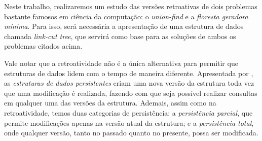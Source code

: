 Neste trabalho, realizaremos um estudo das versões retroativas de dois problemas bastante famosos em ciência da computação: o \emph{union-find} e a \emph{floresta geradora mínima}. Para isso, será necessária a apresentação de uma estrutura de dados chamada \emph{link-cut tree}, que servirá como base para as soluções de ambos os problemas citados acima.



Vale notar que a retroatividade não é a única alternativa para permitir que estruturas de dados lidem com o tempo de maneira diferente. Apresentada por \citet{sarnak1986persistent}, as \emph{estruturas de dados persistentes} criam uma nova versão da estrutura toda vez que uma modificação é realizada, fazendo com que seja possível realizar consultas em qualquer uma das versões da estrutura. Ademais, assim como na retroatividade, temos duas categorias de persistência: a \emph{persistência parcial}, que permite modificações apenas na versão atual da estrutura; e a \emph{persistência total}, onde qualquer versão, tanto no passado quanto no presente, possa ser modificada.